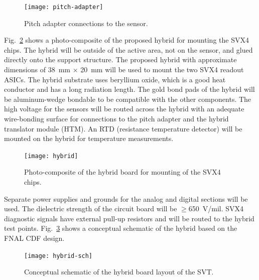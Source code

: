 \begin{figure}[htbp]
\centering
\texttt{[image: pitch-adapter]}
\caption{\small{Pitch adapter connections to the sensor.}}
\label{fig:pitch-adapter}
\end{figure}

Fig.~\ref{fig:hybrid} shows a photo-composite of the proposed hybrid for
mounting the SVX4 chips.  The hybrid will be outside of the active area, 
not on the sensor, and glued directly onto the support structure.  The 
proposed hybrid with approximate dimensions of 38~mm $\times$ 20~mm will 
be used to mount the two SVX4 readout ASICs.  The hybrid substrate uses 
beryllium oxide, which is a good heat conductor and has a long radiation 
length.  The gold bond pads of the hybrid will be aluminum-wedge bondable 
to be compatible with the other components.  The high voltage for the 
sensors will be routed across the hybrid with an adequate wire-bonding 
surface for connections to the pitch adapter and the hybrid translator 
module (HTM).  An RTD (resistance temperature detector) will be mounted 
on the hybrid for temperature measurements.

\begin{figure}[htbp]
\centering
\texttt{[image: hybrid]}
\caption{\small{Photo-composite of the hybrid board for mounting of the
SVX4 chips.}}
\label{fig:hybrid}
\end{figure}

Separate power supplies and grounds for the analog and digital sections 
will be used.  The dielectric strength of the circuit board will be 
$\geq$650~V/mil.  SVX4 diagnostic signals have external pull-up resistors 
and will be routed to the hybrid test points.  Fig.~\ref{fig:hybrid-sch} 
shows a conceptual schematic of the hybrid based on the FNAL CDF design.

\begin{figure}[htbp]
\centering
\texttt{[image: hybrid-sch]}
\caption{\small{Conceptual schematic of the hybrid board layout of the
SVT.}}
\label{fig:hybrid-sch}
\end{figure}

